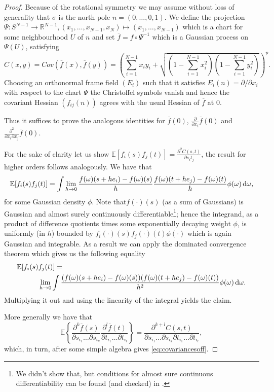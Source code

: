 \begin{proof}
	Because of the rotational symmetry we may assume without loss of generality that $\sigma$ is the north pole $n=(0,\dots,0,1)$. We define the projection $\Psi:S^{N-1}\rightarrow\mathbb R^{N-1}, (x_1,\dots,x_{N-1},x_N)\mapsto(x_1,\dots,x_{N-1})$ which is a chart for some neighbourhood $U$ of $n$ and set $\overline f = f\circ\Psi^{-1}$ which is a Gaussian process on $\Psi(U)$, satisfying $$C(x,y)=Cov(\overline f(x),\overline f(y))=\left(\sum_{i=1}^{N-1}x_iy_i + \sqrt{(1-\textstyle\sum_{i=1}^{N-1}x_i^2)(1-\textstyle\sum_{i=1}^{N-1}y_i^2)}\right)^p.$$
	Choosing an orthonormal frame field $(E_i)$ such that it satisfies $E_i(n)=\partial/\partial x_i$ with respect to the chart $\Psi$ the Christoffel symbols vanish and hence the covariant Hessian $(f_{ij}(n))$ agrees with the usual Hessian of $\overline f$ at $0$.
	
	Thus it suffices to prove the analogous identities for $\overline f(0)$, $\frac{\partial}{\partial x_i}\overline f(0)$ and $\frac{\partial^2}{\partial x_i\partial x_j}\overline f(0)$.
	
	For the sake of clarity let us show $\mathbb E[f_i(s)f_j(t)]=\frac{\partial^2 C(s,t)}{\partial s_it_j}$, the result for higher orders follows analogously. We have that $$\mathbb E[f_i(s)f_j(t)] = \int \lim_{h\rightarrow 0} \frac{f(\omega)(s+he_i)-f(\omega)(s)}{h}\frac{f(\omega)(t+he_j)-f(\omega)(t)}{h}\phi(\omega)\mathop{}\!\mathrm{d}\omega,$$ for some Gaussian density $\phi$. Note that$f(\cdot)(s)$ (as a sum of Gaussians) is Gaussian and almost surely continuously differentiable\footnote{We didn't show that, but conditions for almost sure continuous differentiability can be found (and checked) in \cite{Adler07}.}; hence the integrand, as a product of difference quotients times some exponentially decaying weight $\phi$, is uniformly (in $h$) bounded by $f_i(\cdot)(s)f_j(\cdot)(t)\phi(\cdot)$ which is again Gaussian and integrable. As a result we can apply the dominated convergence theorem which gives us the following equality 
	\begin{align*}
		\mathbb E[f_i(s)&f_j(t)]=\\
		&\lim_{h\rightarrow 0}\int\frac{(f(\omega)(s+he_i)-f(\omega)(s))(f(\omega)(t+he_j)-f(\omega)(t))}{h^2}\phi(\omega)\mathop{}\!\mathrm{d}\omega.
	\end{align*}
	Multiplying it out and using the linearity of the integral yields the claim.
	
	More generally we have that
	\begin{equation}
	\mathbb E\left\{\frac{\partial^k \overline f(s)}{\partial s_{i_1}\dots\partial s_{i_k}} \frac{\partial^l \overline f(t)}{\partial t_{i_1}\dots\partial t_{i_l}}\right\}=\frac{\partial^{k+l} C(s,t)}{\partial s_{i_1}\dots\partial s_{i_k}\partial t_{i_1}\dots\partial t_{i_l}},
	\end{equation}
	which, in turn, after some simple algebra gives \eqref{eq:covariancesoff}.
\end{proof}


